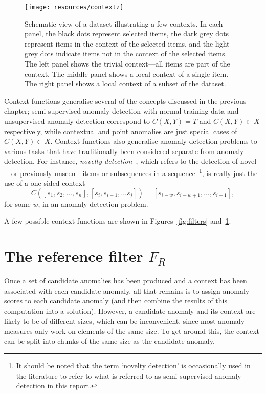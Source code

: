 \begin{figure}[thb]
    \vspace{-4pt}
    \begin{center}
        \leavevmode
        \texttt{[image: resources/contextz]}
    \end{center}
    \vspace{-15pt}
    \caption{{\small Schematic view of a dataset illustrating a few contexts. In each panel, the black dots represent selected items, the dark grey dots represent items in the context of the selected items, and the light grey dots indicate items not in the context of the selected items. The left panel shows the trivial context---all items are part of the context. The middle panel shows a local context of a single item. The right panel shows a local context of a subset of the dataset.}}
\label{fig:contexts}
    \vspace{-5pt}
\end{figure}

Context functions generalise several of the concepts discussed in the previous chapter; semi-supervised anomaly detection with normal training data and unsupervised anomaly detection correspond to $C(X, Y) = T$ and $C(X, Y) \subset X$ respectively, while contextual and point anomalies are just special cases of $C(X, Y) \subset X$. Context functions also generalise anomaly detection problems to various tasks that have traditionally been considered separate from anomaly detection. For instance, \emph{novelty detection}~\cite{chandola}, which refers to the detection of novel---or previously unseen---items or subsequences in a sequence~\footnote{It should be noted that the term `novelty detection' is occasionally used in the literature to refer to what is referred to as semi-supervised anomaly detection in this report.}, is really just the use of a one-sided context
\[
    C([s_1, s_2, \dots, s_n], [s_i, s_{i+1}, \dots s_j]) = [s_{i-w}, s_{i - w + 1}, \dots, s_{i - 1}],
\]
for some $w$, in an anomaly detection problem.

A few possible context functions are shown in Figures~\ref{fig:filters} and~\ref{fig:contexts}.

\section{The reference filter $F_R$}

Once a set of candidate anomalies has been produced and a context has been associated with each candidate anomaly, all that remains is to assign anomaly scores to each candidate anomaly (and then combine the results of this computation into a solution). However, a candidate anomaly and its context are likely to be of different sizes, which can be inconvenient, since most anomaly measures only work on elements of the same size. To get around this, the context can be split into chunks of the same size as the candidate anomaly.


